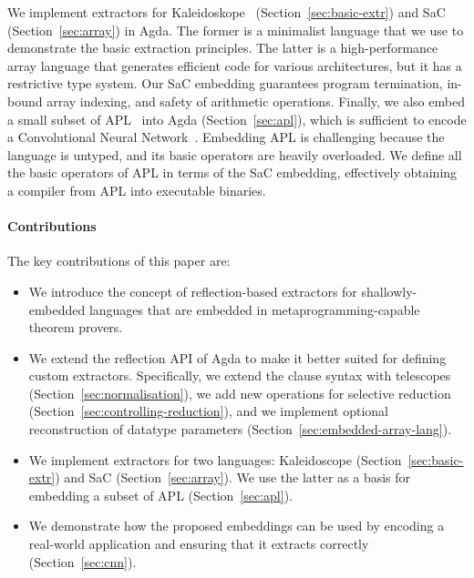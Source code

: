 \documentclass[acmsmall,review,anonymous]{acmart}\settopmatter{printfolios=true,printccs=false,printacmref=false}
\begin{document}
We implement extractors for Kaleidoskope~\cite{kaleidoscope} (Section~\ref{sec:basic-extr})
and SaC~\cite{sac} (Section~\ref{sec:array}) in Agda.
The former is a minimalist language that we use to demonstrate the basic
extraction principles.  The latter is a high-performance
array language that generates efficient code for various architectures, but
it has a restrictive type system.  Our SaC embedding guarantees
program termination, in-bound array indexing, and safety of arithmetic operations.
%
Finally, we also embed a small subset of APL~\cite{APL} into Agda (Section~\ref{sec:apl}), which
is sufficient to encode a Convolutional Neural
Network~\cite{cnninapl}.  Embedding APL is challenging because the
language is untyped, and its basic operators are heavily overloaded.
We define all the basic operators of APL in terms of the SaC embedding,
effectively obtaining a compiler from APL into executable binaries.

\paragraph{Contributions}
The key contributions of this paper are:
\begin{itemize}
    \item We introduce the concept of reflection-based extractors
            for shallowly-embedded languages that are embedded
            in metaprogramming-capable theorem provers.
    \item We extend the reflection API of
            Agda to make it better suited for defining
            custom extractors. Specifically, we extend the clause
            syntax with telescopes (Section~\ref{sec:normalisation}), we add new operations for
            selective reduction (Section~\ref{sec:controlling-reduction}), and we implement optional reconstruction
            of datatype parameters (Section~\ref{sec:embedded-array-lang}).
    \item We implement extractors for two languages: Kaleidoscope (Section~\ref{sec:basic-extr})
            and SaC (Section~\ref{sec:array}).  We use the latter as a basis for embedding
            a subset of APL (Section~\ref{sec:apl}).
    \item We demonstrate how the proposed embeddings can be used
            by encoding a real-world application and ensuring that
            it extracts correctly (Section~\ref{sec:cnn}).
\end{itemize}

\end{document}

